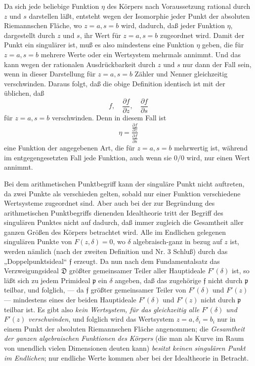 \documentclass[11pt]{article}
\providecommand{\p}{\partial}
\providecommand{\frp}{\mathfrak p}
\providecommand{\frf}{\mathfrak f}
\providecommand{\frD}{\mathfrak D}
\providecommand{\p}{\partial}
\begin{document}
Da sich jede beliebige Funktion \(\eta\) des Körpers nach Voraussetzung rational durch \(z\) und \(s\) darstellen läßt, entsteht wegen der Isomorphie jeder Punkt der absoluten Riemannschen Fläche, wo \(z=a,s=b\) wird, dadurch, daß jeder Funktion \(\eta\), dargestellt durch \(z\) und \(s\), ihr Wert für \(z=a,s=b\) zugeordnet wird. Damit der Punkt ein singulärer ist, muß es also mindestens eine Funktion \(\eta\) geben, die für \(z=a,s=b\) mehrere Werte oder ein Wertsystem mehrmals annimmt. Und das kann wegen der rationalen Ausdrückbarkeit durch \(z\) und \(s\) nur dann der Fall sein, wenn in dieser Darstellung für \(z=a,s=b\) Zähler und Nenner gleichzeitig verschwinden. Daraus folgt, daß die obige Definition identisch ist mit der üblichen, daß
\[
f,\quad \frac{\p f}{\p z},\quad \frac{\p f}{\p s}
\]
für \(z=a,s=b\) verschwinden. Denn in diesem Fall ist
\[
\eta=\frac{\frac{\p f}{\p z}}{\frac{\p f}{\p s}}
\]
eine Funktion der angegebenen Art, die für \(z=a,s=b\) mehrwertig ist, während im entgegengesetzten Fall jede Funktion, auch wenn sie \(0/0\) wird, nur einen Wert annimmt.

Bei dem arithmetischen Punktbegriff kann der singuläre Punkt nicht auftreten, da zwei Punkte als verschieden gelten, sobald nur einer Funktion verschiedene Wertsysteme zugeordnet sind. Aber auch bei der zur Begründung des arithmetischen Punktbegriffs dienenden Idealtheorie tritt der Begriff des singulären Punktes nicht auf dadurch, daß immer zugleich die Gesamtheit aller ganzen Größen des Körpers betrachtet wird. Alle im Endlichen gelegenen singulären Punkte von \(F(z,\delta)=0\), wo \(\delta\) algebraisch-ganz in bezug auf \(z\) ist, werden nämlich (nach der zweiten Definition und Nr. 3 Schluß) durch das „Doppelpunktsideal“ \(\frf\) erzeugt. Da nun nach dem Fundamentalsatz das Verzweigungsideal \(\frD\) größter gemeinsamer Teiler aller Hauptideale \(F'(\delta)\) ist, so läßt sich zu jedem Primideal \(\frp\) ein \(\delta\) angeben, daß das zugehörige \(\frf\) nicht durch \(\frp\) teilbar, und folglich, --- da \(\frf\) größter gemeinsamer Teiler von \(F'(\delta)\) und \(F'(z)\) --- mindestens eines der beiden Hauptideale \(F'(\delta)\) und \(F'(z)\) nicht durch \(\frp\) teilbar ist. Es gibt also \emph{kein Wertsystem, für das gleichzeitig alle \(F'(\delta)\) und \(F'(z)\) verschwinden}, und folglich wird das Wertsystem \(z=a,\delta_i=b_i\) nur in einem Punkt der absoluten Riemannschen Fläche angenommen; die \emph{Gesamtheit der ganzen algebraischen Funktionen des Körpers} (die man als Kurve im Raum von unendlich vielen Dimensionen deuten kann) \emph{besitzt keinen singulären Punkt im Endlichen}; nur endliche Werte kommen aber bei der Idealtheorie in Betracht.
\end{document}
